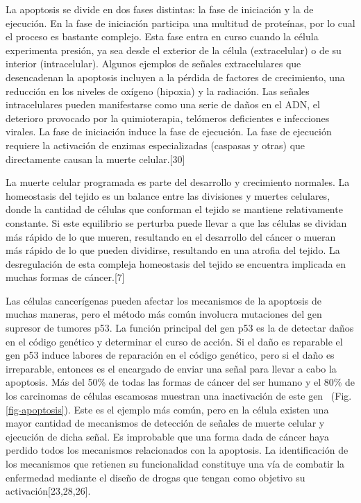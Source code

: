 \hspace{.1cm}La apoptosis se divide en dos fases distintas: la fase de iniciación y la de ejecución. En la fase de iniciación participa una multitud de proteínas, por lo cual el proceso es bastante complejo. Esta fase entra en curso cuando la célula experimenta presión, ya sea desde el exterior de la célula (extracelular) o de su interior (intracelular). Algunos ejemplos de señales extracelulares que desencadenan la apoptosis incluyen a la pérdida de factores de crecimiento, una reducción en los niveles de oxígeno (hipoxia) y la radiación. Las señales intracelulares pueden manifestarse como una serie de daños en el ADN, el deterioro provocado por la quimioterapia, telómeros deficientes e infecciones virales. La fase de iniciación induce la fase de ejecución. La fase de ejecución requiere la activación de enzimas especializadas (caspasas y otras) que directamente causan la muerte celular.[30]

\hspace{.1cm}La muerte celular programada es parte del desarrollo y crecimiento normales. La homeostasis del tejido es un balance entre las divisiones y muertes celulares, donde la cantidad de células que conforman el tejido se mantiene relativamente constante. Si este equilibrio se perturba puede llevar a que las células se dividan más rápido de lo que mueren, resultando en el desarrollo del cáncer o mueran más rápido de lo que pueden dividirse, resultando en una atrofia del tejido. La desregulación de esta compleja homeostasis del tejido se encuentra implicada en muchas formas de cáncer.[7]

\hspace{.1cm}Las células cancerígenas pueden afectar los mecanismos de la apoptosis de muchas maneras, pero el método más común involucra mutaciones del gen supresor de tumores p53. La función principal del gen p53 es la de detectar daños en el código genético y determinar el curso de acción. Si el daño es reparable el gen p53 induce labores de reparación en el código genético, pero si el daño es irreparable, entonces es el encargado de enviar una señal para llevar a cabo la apoptosis. Más del 50\% de todas las formas de cáncer del ser humano y el 80\% de los carcinomas de células escamosas muestran una inactivación de este gen ~(Fig.\ref{fig-apoptosis}). Este es el ejemplo más común, pero en la célula existen una mayor cantidad de mecanismos de detección de señales de muerte celular y ejecución de dicha señal. Es improbable que una forma dada de cáncer haya perdido todos los mecanismos relacionados con la apoptosis. La identificación de los mecanismos que retienen su funcionalidad constituye una vía de combatir la enfermedad mediante el diseño de drogas que tengan como objetivo su activación[23,28,26].


